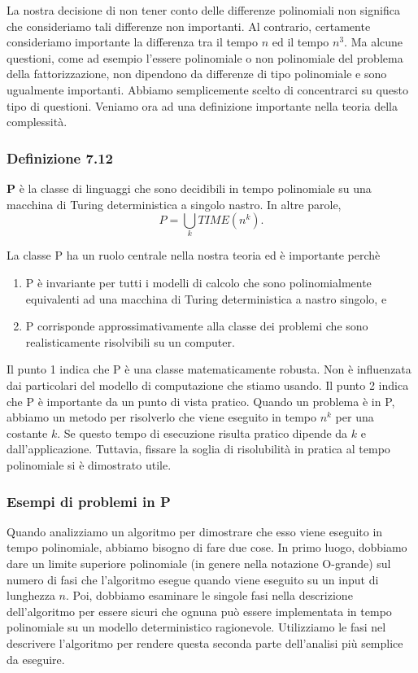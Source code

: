 \documentclass{article}
\begin{document}
La nostra decisione di non tener conto delle differenze polinomiali non significa che consideriamo tali differenze non importanti.
Al contrario, certamente consideriamo importante la differenza tra il tempo $n$ ed il tempo $n^3$.
Ma alcune questioni, come ad esempio l'essere polinomiale o non polinomiale del problema della fattorizzazione, non dipendono da differenze di tipo polinomiale e sono ugualmente importanti.
Abbiamo semplicemente scelto di concentrarci su questo tipo di questioni.
\newline
Veniamo ora ad una definizione importante nella teoria della complessità.
\subsubsection{Definizione 7.12}
\label{definizione-7.12}
\begin{tcolorbox}[colback=yellow!10!white, colframe=yellow!50!black, title=Definizione 7.12]
    \textbf{P} è la classe di linguaggi che sono decidibili in tempo polinomiale su una macchina di Turing deterministica a singolo nastro. 
    In altre parole,
    $$
    P = \bigcup_{k} TIME(n^k).
    $$
\end{tcolorbox}
La classe P ha un ruolo centrale nella nostra teoria ed è importante perchè
\begin{enumerate}
    \item P è invariante per tutti i modelli di calcolo che sono polinomialmente equivalenti ad una macchina di Turing deterministica a nastro singolo, e
    \item P corrisponde approssimativamente alla classe dei problemi che sono realisticamente risolvibili su un computer.
\end{enumerate}
Il punto 1 indica che P è una classe matematicamente robusta.
Non è influenzata dai particolari del modello di computazione che stiamo usando.
\newline
Il punto 2 indica che P è importante da un punto di vista pratico.
Quando un problema è in P, abbiamo un metodo per risolverlo che viene eseguito in tempo $n^k$ per una costante $k$.
Se questo tempo di esecuzione risulta pratico dipende da $k$ e dall'applicazione.
Tuttavia, fissare la soglia di risolubilità in pratica al tempo polinomiale si è dimostrato utile.

\subsubsection{Esempi di problemi in P}
Quando analizziamo un algoritmo per dimostrare che esso viene eseguito in tempo polinomiale, abbiamo bisogno di fare due cose. 
In primo luogo, dobbiamo dare un limite superiore polinomiale (in genere nella notazione O-grande) sul numero di fasi che l'algoritmo esegue quando viene eseguito su un input di lunghezza $n$.
Poi, dobbiamo esaminare le singole fasi nella descrizione dell'algoritmo per essere sicuri che ognuna può essere implementata in tempo polinomiale su un modello deterministico ragionevole.
Utilizziamo le fasi nel descrivere l'algoritmo per rendere questa seconda
parte dell'analisi più semplice da eseguire.
\end{document}
